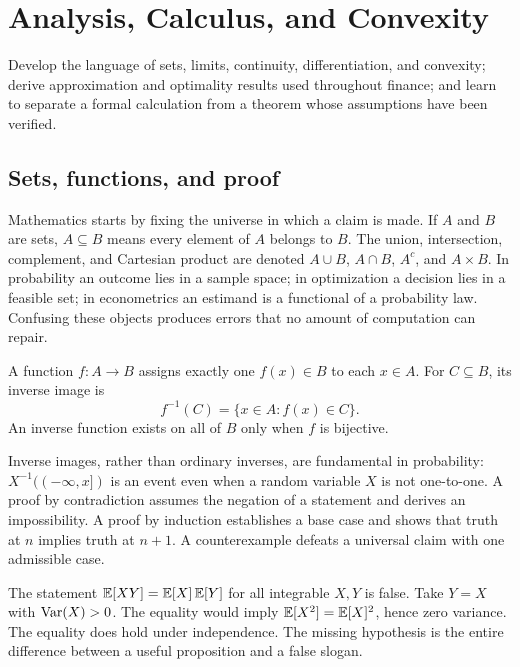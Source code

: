 \chapter{Analysis, Calculus, and Convexity}

\begin{objectives}
Develop the language of sets, limits, continuity, differentiation, and convexity;
derive approximation and optimality results used throughout finance; and learn to
separate a formal calculation from a theorem whose assumptions have been verified.
\end{objectives}

\section{Sets, functions, and proof}

Mathematics starts by fixing the universe in which a claim is made. If $A$ and $B$
are sets, $A\subseteq B$ means every element of $A$ belongs to $B$. The union,
intersection, complement, and Cartesian product are denoted $A\cup B$, $A\cap B$,
$A^c$, and $A\times B$. In probability an outcome lies in a sample space; in
optimization a decision lies in a feasible set; in econometrics an estimand is a
functional of a probability law. Confusing these objects produces errors that no
amount of computation can repair.

\begin{definition}
A function $f:A\to B$ assigns exactly one $f(x)\in B$ to each $x\in A$. For
$C\subseteq B$, its inverse image is
\[
f^{-1}(C)=\{x\in A:f(x)\in C\}.
\]
An inverse function exists on all of $B$ only when $f$ is bijective.
\end{definition}

Inverse images, rather than ordinary inverses, are fundamental in probability:
$X^{-1}((-\infty,x])$ is an event even when a random variable $X$ is not one-to-one.
A proof by contradiction assumes the negation of a statement and derives an
impossibility. A proof by induction establishes a base case and shows that truth at
$n$ implies truth at $n+1$. A counterexample defeats a universal claim with one
admissible case.

\begin{example}
The statement $\operatorname{\mathbb E}[XY]=\operatorname{\mathbb E}[X]\operatorname{\mathbb E}[Y]$ for all integrable $X,Y$ is false. Take $Y=X$
with $\operatorname{Var}(X)>0$. The equality would imply $\operatorname{\mathbb E}[X^2]=\operatorname{\mathbb E}[X]^2$, hence zero variance.
The equality does hold under independence. The missing hypothesis is the entire
difference between a useful proposition and a false slogan.
\end{example}

